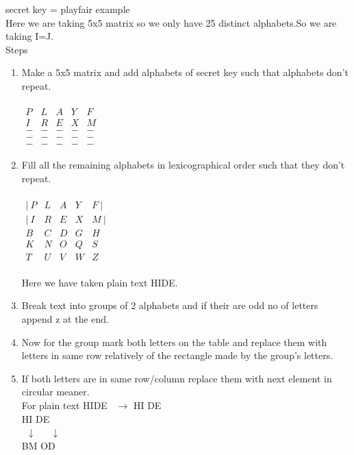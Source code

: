 \documentclass[11pt]{article}
\begin{document}
secret key = playfair example \\
Here we are taking 5x5 matrix so we only have 25 distinct alphabets.So we are taking I=J.\\
Steps 
\begin{enumerate}
    \item Make a 5x5 matrix and add alphabets of secret key such that alphabets don't repeat.
       \\\\
       $\begin{array}{ccccc}
        P & L & A & Y & F \\
        I & R & E & X & M \\
        - & - & - & - & - \\
        - & - & - & - & - \\
        - & - & - & - & -
        \end{array}$
    \\
    \item Fill all the remaining alphabets in lexicographical order such that they don't repeat.
    \\\\
        $\begin{array}{ccccc}
        \hline
        |\ P & L & A & Y & F\ | \\
        |\ I & R & E & X & M\ | \\
        \hline
        B & C & D & G & H \\
        K & N & O & Q & S \\
        T & U & V & W & Z
        \end{array}$
    \\\\
    Here we have taken plain text HIDE.\\

    \item Break text into groups of 2 alphabets and if their are odd no of letters append z at the end.
    \item Now for the group mark both letters on the table and replace them with letters in same row relatively of the rectangle made by the group's letters.
    \item If both letters are in same row/column replace them with next element in circular meaner.\\

    For plain text HIDE \ $\rightarrow$ HI DE \\
    HI  DE\\
    $\ \ \downarrow\ \ \ $ \ $\downarrow$ \\
    BM  OD
\end{enumerate}
\end{document}

